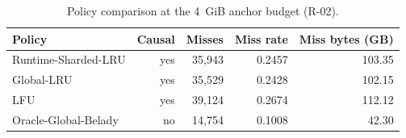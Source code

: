 \begin{table}[t]
\centering
\caption{Policy comparison at the 4~GiB anchor budget (R-02).}
\label{tab:r2-02-comparison}
\small
\begin{tabular}{@{}lrrrr@{}}
\toprule
Policy & Causal & Misses & Miss rate & Miss bytes (GB) \\
\midrule
Runtime-Sharded-LRU & yes & 35,943 & 0.2457 & 103.35 \\
Global-LRU & yes & 35,529 & 0.2428 & 102.15 \\
LFU & yes & 39,124 & 0.2674 & 112.12 \\
Oracle-Global-Belady & no & 14,754 & 0.1008 & 42.30 \\
\bottomrule
\end{tabular}
\end{table}
